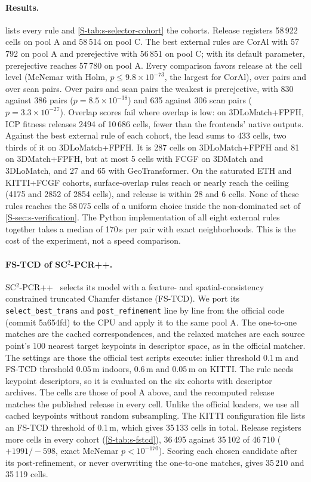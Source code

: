 \paragraph{Results.}  lists every rule and \cref{S-tab:s-selector-cohort} the cohorts. Release registers 58\,922 cells on pool A and 58\,514 on pool C. The best external rules are CorAl with 57\,792 on pool A and prerejective with 56\,851 on pool C; with its default parameter, prerejective reaches 57\,780 on pool A. Every comparison favors release at the cell level (McNemar with Holm, $p\le9.8\times10^{-73}$, the largest for CorAl), over pairs and over scan pairs. Over pairs and scan pairs the weakest is prerejective, with 830 against 386 pairs ($p=8.5\times10^{-38}$) and 635 against 306 scan pairs ($p=3.3\times10^{-27}$). Overlap scores fail where overlap is low: on 3DLoMatch+FPFH, ICP fitness releases 2494 of 10\,686 cells, fewer than the frontends' native outputs. Against the best external rule of each cohort, the lead sums to 433 cells, two thirds of it on 3DLoMatch+FPFH. It is 287 cells on 3DLoMatch+FPFH and 81 on 3DMatch+FPFH, but at most 5 cells with FCGF on 3DMatch and 3DLoMatch, and 27 and 65 with GeoTransformer. On the saturated ETH and KITTI+FCGF cohorts, surface-overlap rules reach or nearly reach the ceiling (4175 and 2852 of 2854 cells), and release is within 28 and 6 cells. None of these rules reaches the 58\,075 cells of a uniform choice inside the non-dominated set of \cref{S-sec:s-verification}. The Python implementation of all eight external rules together takes a median of 170\,s per pair with exact neighborhoods. This is the cost of the experiment, not a speed comparison.

\paragraph{FS-TCD of SC$^2$-PCR++.} SC$^2$-PCR++~\cite{chen2023sc2pp} selects its model with a feature- and spatial-consistency constrained truncated Chamfer distance (FS-TCD). We port its \texttt{select\_best\_trans} and \texttt{post\_refinement} line by line from the official code (commit 5a654fd) to the CPU and apply it to the same pool A. The one-to-one matches are the cached correspondences, and the relaxed matches are each source point's 100 nearest target keypoints in descriptor space, as in the official matcher. The settings are those the official test scripts execute: inlier threshold 0.1\,m and FS-TCD threshold 0.05\,m indoors, 0.6\,m and 0.05\,m on KITTI. The rule needs keypoint descriptors, so it is evaluated on the six cohorts with descriptor archives. The cells are those of pool A above, and the recomputed release matches the published release in every cell. Unlike the official loaders, we use all cached keypoints without random subsampling. The KITTI configuration file lists an FS-TCD threshold of 0.1\,m, which gives 35\,133 cells in total. Release registers more cells in every cohort (\cref{S-tab:s-fstcd}), 36\,495 against 35\,102 of 46\,710 ($+1991/{-}598$, exact McNemar $p<10^{-170}$). Scoring each chosen candidate after its post-refinement, or never overwriting the one-to-one matches, gives 35\,210 and 35\,119 cells.

